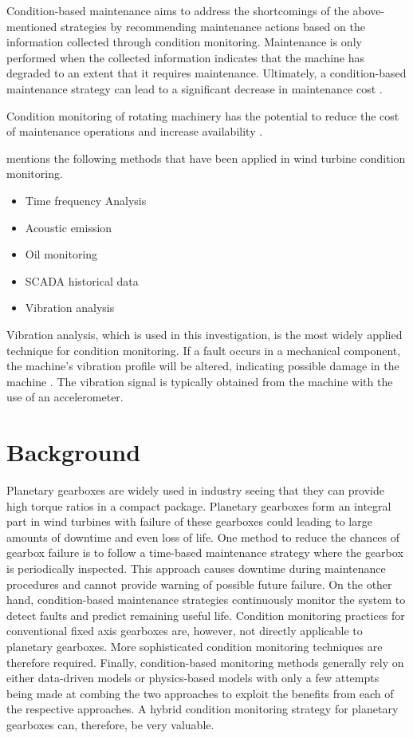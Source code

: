 Condition-based maintenance aims to address the shortcomings of the above-mentioned strategies by recommending maintenance actions based on the information collected through condition monitoring. Maintenance is only performed when the collected information indicates that the machine has degraded to an extent that it requires maintenance. Ultimately, a condition-based maintenance strategy can lead to a significant decrease in maintenance cost \citep{Jardine2006}.

Condition monitoring of rotating machinery has the potential to reduce the cost of maintenance operations and increase availability \cite{Cubillo2016}.



\cite{Nie2013} mentions the following methods that have been applied in wind turbine condition monitoring.
\begin{itemize}
	\item Time frequency Analysis
	\item Acoustic emission
	\item Oil monitoring
	\item SCADA historical data 
	\item Vibration analysis
\end{itemize}

Vibration analysis, which is used in this investigation, is the most widely applied technique for condition monitoring. If a fault occurs in a mechanical component, the machine's vibration profile will be altered, indicating possible damage in the machine \citep{Salameh2018}. The vibration signal is typically obtained from the machine with the use of an accelerometer.


\section{Background}

Planetary gearboxes are widely used in industry seeing that they can provide high torque ratios in a compact package. Planetary gearboxes form an integral part in wind turbines with failure of these gearboxes could leading to large amounts of downtime and even loss of life. One method to reduce the chances of gearbox failure is to follow a time-based maintenance strategy where the gearbox is periodically inspected. This approach causes downtime during maintenance procedures and cannot provide warning of possible future failure. On the other hand, condition-based maintenance strategies continuously monitor the system to detect faults and predict remaining useful life. Condition monitoring practices for conventional fixed axis gearboxes are, however, not directly applicable to planetary gearboxes. More sophisticated condition monitoring techniques are therefore required. Finally, condition-based monitoring methods generally rely on either data-driven models or physics-based models with only a few attempts being made at combing the two approaches to exploit the benefits from each of the respective approaches. A hybrid condition monitoring strategy for planetary gearboxes can, therefore, be very valuable.

